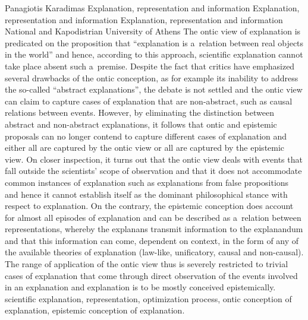 \begin{artengenv}{Panagiotis Karadimas}
	{Explanation, representation and information}
	{Explanation, representation and information}
	{Explanation, representation and information}
	{National and Kapodistrian University of Athens}
	{The ontic view of explanation is predicated on the proposition that ``explanation is a~relation between real objects in the world'' and hence, according to this approach, scientific explanation cannot take place absent such a~premise. Despite the fact that critics have emphasized several drawbacks of the ontic conception, as for example its inability to address the so-called ``abstract explanations'', the debate is not settled and the ontic view can claim to capture cases of explanation that are non-abstract, such as causal relations between events. However, by eliminating the distinction between abstract and non-abstract explanations, it follows that ontic and epistemic proposals can no longer contend to capture different cases of explanation and either all are captured by the ontic view or all are captured by the epistemic view. On closer inspection, it turns out that the ontic view deals with events that fall outside the scientists' scope of observation and that it does not accommodate common instances of explanation such as explanations from false propositions and hence it cannot establish itself as the dominant philosophical stance with respect to explanation. On the contrary, the epistemic conception does account for almost all episodes of explanation and can be described as a~relation between representations, whereby the explanans transmit information to the explanandum and that this information can come, dependent on context, in the form of any of the available theories of explanation (law-like, unificatory, causal and non-causal). The range of application of the ontic view thus is severely restricted to trivial cases of explanation that come through direct observation of the events involved in an explanation and explanation is to be mostly conceived epistemically.
	}
	{scientific explanation, representation, optimization process, ontic conception of explanation, epistemic conception of explanation.}




\end{artengenv}
